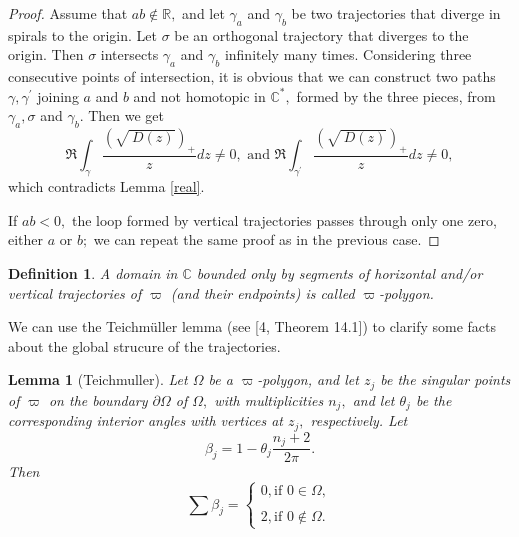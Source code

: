 \documentclass[12pt]{amsart}
\newtheorem{definition}[theorem]{Definition}
\newtheorem{lemma}[theorem]{Lemma}
\begin{document}
\begin{proof}
Assume that $ab\notin 
\mathbb{R}
,$ and let $\gamma _{a}$ and $\gamma _{b}$ be two trajectories that diverge
in spirals to the origin. Let $\sigma $ be an orthogonal trajectory that
diverges to the origin. Then $\sigma $ intersects $\gamma _{a}$ and $\gamma
_{b}$ infinitely many times. Considering three consecutive points of
intersection, it is obvious that we can construct two paths $\gamma ,\gamma
^{\prime }$ joining $a$ and $b$ and not homotopic in $\mathbb{C}
^{\ast },$ formed by the three pieces, from $\gamma _{a},\sigma $ and $\gamma _{b}.$ Then we get 
\begin{equation*}
\Re \int_{\gamma }\dfrac{\left( \sqrt{\ D\left( z\right) }\right) _{+}}{z}dz\neq 0,\text{ and }\Re \int_{\gamma ^{\prime }}\dfrac{\left( \sqrt{\
D\left( z\right) }\right) _{+}}{z}dz\neq 0,
\end{equation*}which contradicts Lemma \ref{real}.

If $ab<0,$ the loop formed by vertical trajectories passes through only one
zero, either $a$ or $b;$ we can repeat the same proof as in the previous
case.
\end{proof}

\begin{definition}
\bigskip A domain in $\mathbb{C}
$ bounded only by segments of horizontal and/or vertical trajectories of $\varpi $ (and their endpoints) is called $\varpi $-polygon.
\end{definition}

We can use the Teichm\"{u}ller lemma (see [4, Theorem 14.1]) to clarify some
facts about the global strucure of the trajectories.

\begin{lemma}[Teichmuller]
\label{teich} Let $\Omega $ be a $\varpi $-polygon, and let $z_{j}$ be the
singular points of $\varpi $ on the boundary $\partial \Omega $ of $\Omega ,$
with multiplicities $n_{j},$ and let $\theta _{j}$ be the corresponding
interior angles with vertices at $z_{j},$ respectively. Let 
\begin{equation*}
\beta _{j}=1-\theta _{j}\dfrac{n_{j}+2}{2\pi }.
\end{equation*}Then\begin{equation*}
\sum \beta _{j}=\left\{ 
\begin{array}{c}
0,\text{if }0\in \Omega , \\ 
\\ 
2,\text{if }0\notin \Omega .\end{array}\right.
\end{equation*}
\end{lemma}
\end{document}

